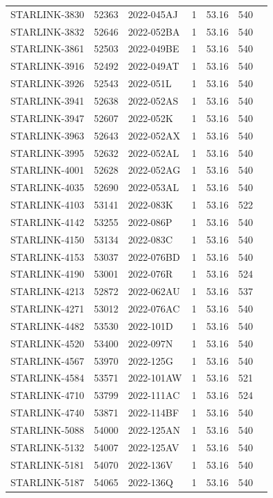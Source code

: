 \begin{longtable}{p{3.5cm}lllccc}
STARLINK-3830 & 52363 & 2022-045AJ & 1 & 53.16 & 540 \\
STARLINK-3832 & 52646 & 2022-052BA & 1 & 53.16 & 540 \\
STARLINK-3861 & 52503 & 2022-049BE & 1 & 53.16 & 540 \\
STARLINK-3916 & 52492 & 2022-049AT & 1 & 53.16 & 540 \\
STARLINK-3926 & 52543 & 2022-051L & 1 & 53.16 & 540 \\
STARLINK-3941 & 52638 & 2022-052AS & 1 & 53.16 & 540 \\
STARLINK-3947 & 52607 & 2022-052K & 1 & 53.16 & 540 \\
STARLINK-3963 & 52643 & 2022-052AX & 1 & 53.16 & 540 \\
STARLINK-3995 & 52632 & 2022-052AL & 1 & 53.16 & 540 \\
STARLINK-4001 & 52628 & 2022-052AG & 1 & 53.16 & 540 \\
STARLINK-4035 & 52690 & 2022-053AL & 1 & 53.16 & 540 \\
STARLINK-4103 & 53141 & 2022-083K & 1 & 53.16 & 522 \\
STARLINK-4142 & 53255 & 2022-086P & 1 & 53.16 & 540 \\
STARLINK-4150 & 53134 & 2022-083C & 1 & 53.16 & 540 \\
STARLINK-4153 & 53037 & 2022-076BD & 1 & 53.16 & 540 \\
STARLINK-4190 & 53001 & 2022-076R & 1 & 53.16 & 524 \\
STARLINK-4213 & 52872 & 2022-062AU & 1 & 53.16 & 537 \\
STARLINK-4271 & 53012 & 2022-076AC & 1 & 53.16 & 540 \\
STARLINK-4482 & 53530 & 2022-101D & 1 & 53.16 & 540 \\
STARLINK-4520 & 53400 & 2022-097N & 1 & 53.16 & 540 \\
STARLINK-4567 & 53970 & 2022-125G & 1 & 53.16 & 540 \\
STARLINK-4584 & 53571 & 2022-101AW & 1 & 53.16 & 521 \\
STARLINK-4710 & 53799 & 2022-111AC & 1 & 53.16 & 524 \\
STARLINK-4740 & 53871 & 2022-114BF & 1 & 53.16 & 540 \\
STARLINK-5088 & 54000 & 2022-125AN & 1 & 53.16 & 540 \\
STARLINK-5132 & 54007 & 2022-125AV & 1 & 53.16 & 540 \\
STARLINK-5181 & 54070 & 2022-136V & 1 & 53.16 & 540 \\
STARLINK-5187 & 54065 & 2022-136Q & 1 & 53.16 & 540 \\

\end{longtable}
